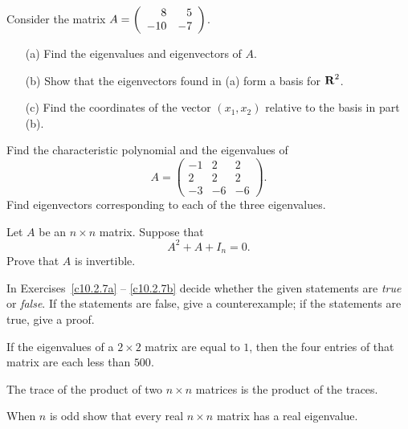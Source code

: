 \begin{exercise} \label{c10.2.4}
Consider the matrix $A=\left(\begin{array}{rr} 8 & 5\\ -10 &-7\end{array}\right)$.
\begin{itemize}
\item[(a)] Find the eigenvalues and eigenvectors of $A$.
\item[(b)] Show that the eigenvectors found in (a) form a basis for $\mbox{$\bf{R}$}^2$.
\item[(c)] Find the coordinates of the vector $(x_1,x_2)$ relative to the 
basis in part (b).
\end{itemize}
\end{exercise}

\begin{exercise} \label{c10.2.5}
Find the characteristic polynomial and the eigenvalues of 
\[
A = \left(\begin{array}{rrr} -1 & 2 & 2 \\ 2 & 2 & 2 \\ -3 & -6 & -6 
\end{array}\right).
\]
Find eigenvectors corresponding to each of the three eigenvalues.
\end{exercise}

\begin{exercise} \label{c10.2.6}
Let $A$ be an $n\times n$ matrix.  Suppose that 
\[
A^2 + A + I_n = 0.
\]
Prove that $A$ is invertible.
\end{exercise}

\noindent In Exercises~\ref{c10.2.7a} -- \ref{c10.2.7b} decide whether 
the given statements are {\em true\/} or {\em false\/}. If the 
statements are false, give a counterexample; if the statements are true, 
give a proof.
\begin{exercise} \label{c10.2.7a}
If the eigenvalues of a $2\times 2$ matrix are equal to $1$,
then the four entries of that matrix are each less than $500$.
\end{exercise}
\begin{exercise} \label{c10.2.7b}
The trace of the product of two $n\times n$ matrices is the
product of the traces.
\end{exercise}

\begin{exercise} \label{c10.2.8}
When $n$ is odd show that every real $n\times n$ matrix has a real
eigenvalue. 
\end{exercise}

\CEXER

